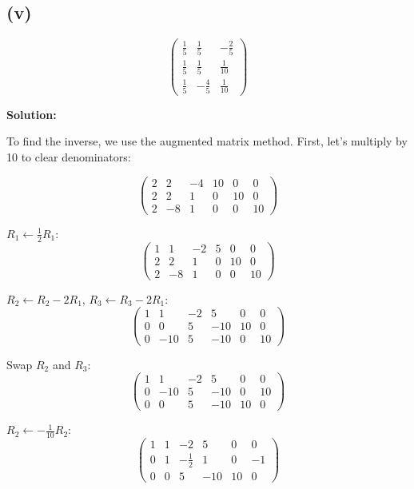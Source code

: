 \subsection*{(v)}
\[
	\begin{pmatrix}
		\frac{1}{5} & \frac{1}{5}  & -\frac{2}{5} \\
		\frac{1}{5} & \frac{1}{5}  & \frac{1}{10} \\
		\frac{1}{5} & -\frac{4}{5} & \frac{1}{10}
	\end{pmatrix}
\]

\textbf{Solution:}

To find the inverse, we use the augmented matrix method. First, let's multiply by 10 to clear denominators:

\[
	\left(\begin{array}{ccc|ccc}
			2 & 2  & -4 & 10 & 0  & 0  \\
			2 & 2  & 1  & 0  & 10 & 0  \\
			2 & -8 & 1  & 0  & 0  & 10
		\end{array}\right)
\]

$R_1 \leftarrow \frac{1}{2}R_1$:
\[
	\left(\begin{array}{ccc|ccc}
			1 & 1  & -2 & 5 & 0  & 0  \\
			2 & 2  & 1  & 0 & 10 & 0  \\
			2 & -8 & 1  & 0 & 0  & 10
		\end{array}\right)
\]

$R_2 \leftarrow R_2 - 2R_1$, $R_3 \leftarrow R_3 - 2R_1$:
\[
	\left(\begin{array}{ccc|ccc}
			1 & 1   & -2 & 5   & 0  & 0  \\
			0 & 0   & 5  & -10 & 10 & 0  \\
			0 & -10 & 5  & -10 & 0  & 10
		\end{array}\right)
\]

Swap $R_2$ and $R_3$:
\[
	\left(\begin{array}{ccc|ccc}
			1 & 1   & -2 & 5   & 0  & 0  \\
			0 & -10 & 5  & -10 & 0  & 10 \\
			0 & 0   & 5  & -10 & 10 & 0
		\end{array}\right)
\]

$R_2 \leftarrow -\frac{1}{10}R_2$:
\[
	\left(\begin{array}{ccc|ccc}
			1 & 1 & -2           & 5   & 0  & 0  \\
			0 & 1 & -\frac{1}{2} & 1   & 0  & -1 \\
			0 & 0 & 5            & -10 & 10 & 0
		\end{array}\right)
\]


